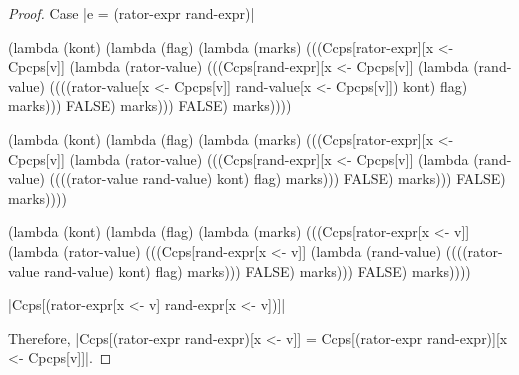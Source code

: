 \begin{proof}{Case \scheme|e = (rator-expr rand-expr)|}
\begin{schemeblock}
\begin{schemedisplay}
(lambda (kont)
   (lambda (flag)
     (lambda (marks)
       (((Ccps[rator-expr][x <- Cpcps[v]]
          (lambda (rator-value)
            (((Ccps[rand-expr][x <- Cpcps[v]]
               (lambda (rand-value)
                 ((((rator-value[x <- Cpcps[v]] rand-value[x <- Cpcps[v]]) kont) flag) marks)))
              FALSE) marks)))
         FALSE) marks))))
\end{schemedisplay}
\end{schemeblock}

\begin{schemeblock}
\begin{schemedisplay}
(lambda (kont)
   (lambda (flag)
     (lambda (marks)
       (((Ccps[rator-expr][x <- Cpcps[v]]
          (lambda (rator-value)
            (((Ccps[rand-expr][x <- Cpcps[v]]
               (lambda (rand-value)
                 ((((rator-value rand-value) kont) flag) marks)))
              FALSE) marks)))
         FALSE) marks))))
\end{schemedisplay}
\end{schemeblock}

\begin{schemeblock}
\begin{schemedisplay}
(lambda (kont)
   (lambda (flag)
     (lambda (marks)
       (((Ccps[rator-expr[x <- v]]
          (lambda (rator-value)
            (((Ccps[rand-expr[x <- v]]
               (lambda (rand-value)
                 ((((rator-value rand-value) kont) flag) marks)))
              FALSE) marks)))
         FALSE) marks))))
\end{schemedisplay}
\end{schemeblock}

\noindent
\scheme|Ccps[(rator-expr[x <- v] rand-expr[x <- v])]|

\noindent
Therefore, \scheme|Ccps[(rator-expr rand-expr)[x <- v]] = Ccps[(rator-expr rand-expr)][x <- Cpcps[v]]|.
\end{proof}

